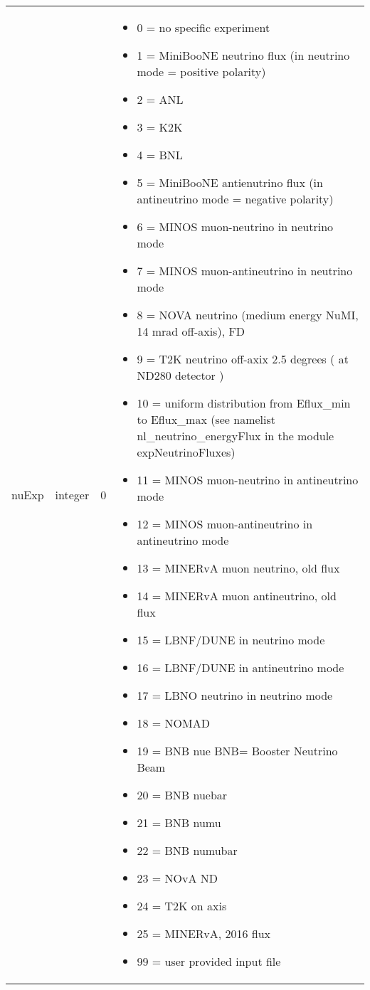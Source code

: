 \documentclass{article}
\begin{document}
\begin{longtable}{llll}
nuExp & \begin{minipage}[t]{2cm}integer\end{minipage} & \begin{minipage}[t]{2cm}0\end{minipage} & \begin{minipage}[t]{12cm}\begin{itemize}\leftmargin0em\itemindent0pt\item 0 = no specific experiment\item 1 = MiniBooNE neutrino flux (in neutrino mode = positive polarity)\item 2 = ANL\item 3 = K2K\item 4 = BNL\item 5 = MiniBooNE antienutrino flux (in antineutrino mode = negative polarity)\item 6 = MINOS muon-neutrino  in neutrino mode\item 7 = MINOS muon-antineutrino  in neutrino mode\item 8 = NOVA neutrino (medium energy NuMI, 14 mrad off-axis), FD\item 9 = T2K neutrino off-axix 2.5 degrees ( at ND280 detector )\item 10 = uniform distribution from Eflux\_min to Eflux\_max       (see namelist nl\_neutrino\_energyFlux in the module expNeutrinoFluxes)\item 11 = MINOS muon-neutrino  in antineutrino mode\item 12 = MINOS muon-antineutrino  in antineutrino mode\item 13 = MINERvA muon neutrino, old flux\item 14 = MINERvA muon antineutrino, old flux\item 15 = LBNF/DUNE in neutrino mode\item 16 = LBNF/DUNE in antineutrino mode\item 17 = LBNO neutrino in neutrino mode\item 18 = NOMAD\item 19 = BNB nue          BNB= Booster Neutrino Beam\item 20 = BNB nuebar\item 21 = BNB numu\item 22 = BNB numubar\item 23 = NOvA ND\item 24 = T2K on axis\item 25 = MINERvA, 2016 flux\item 99 = user provided input file\end{itemize}\end{minipage}\\*

\end{longtable}
\end{document}
